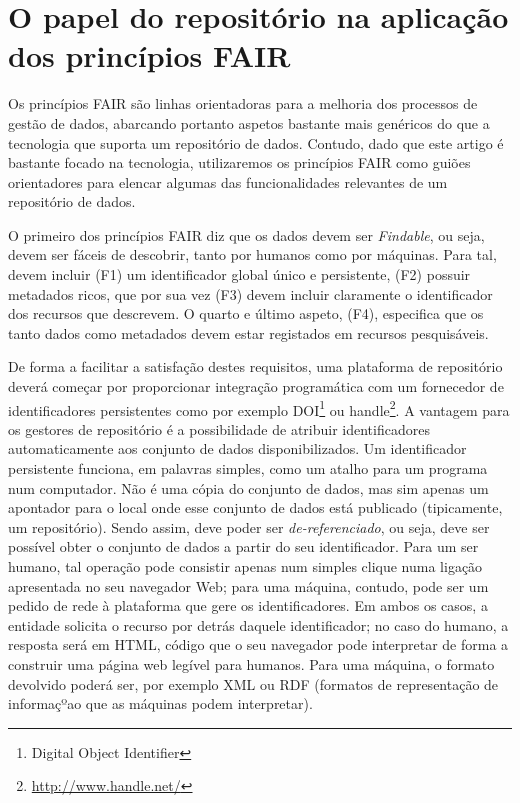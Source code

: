 \documentclass[sigconf,nonacm]{acmart}
\begin{document}
\section{O papel do repositório na aplicação dos princípios FAIR} %
\label{sec:o_papel_do_repositorio_na_aplicacao_dos_principios_fair}

Os princípios FAIR são linhas orientadoras para a melhoria dos processos de gestão de dados, abarcando portanto aspetos bastante mais genéricos do que a tecnologia que suporta um repositório de dados. Contudo, dado que este artigo é bastante focado na tecnologia, utilizaremos os princípios FAIR como guiões orientadores para elencar algumas das funcionalidades relevantes de um repositório de dados. 

O primeiro dos princípios FAIR diz que os dados devem ser \emph{Findable}, ou seja, devem ser fáceis de descobrir, tanto por humanos como por máquinas. Para tal, devem incluir (F1) um identificador global único e persistente, (F2) possuir metadados ricos, que por sua vez (F3) devem incluir claramente o identificador dos recursos que descrevem. O quarto e último aspeto, (F4), especifica que os tanto dados como metadados devem estar registados em recursos pesquisáveis. 

De forma a facilitar a satisfação destes requisitos, uma plataforma de repositório deverá começar por proporcionar integração programática com um fornecedor de identificadores persistentes como por exemplo DOI\footnote{Digital Object Identifier} ou handle\footnote{\url{http://www.handle.net/}}. A vantagem para os gestores de repositório é a possibilidade de atribuir identificadores automaticamente aos conjunto de dados disponibilizados. Um identificador persistente funciona, em palavras simples, como um atalho para um programa num computador. Não é uma cópia do conjunto de dados, mas sim apenas um apontador para o local onde esse conjunto de dados está publicado (tipicamente, um repositório). Sendo assim, deve poder ser \emph{de-referenciado}, ou seja, deve ser possível obter o conjunto de dados a partir do seu identificador. Para um ser humano, tal operação pode consistir apenas num simples clique numa ligação apresentada no seu navegador Web; para uma máquina, contudo, pode ser um pedido de rede à plataforma que gere os identificadores. Em ambos os casos, a entidade solicita o recurso por detrás daquele identificador; no caso do humano, a resposta será em HTML, código que o seu navegador pode interpretar de forma a construir  uma página web legível para humanos. Para uma máquina, o formato devolvido poderá ser, por exemplo XML ou RDF (formatos de representação de informaçºao que as máquinas podem interpretar). 
\end{document}
